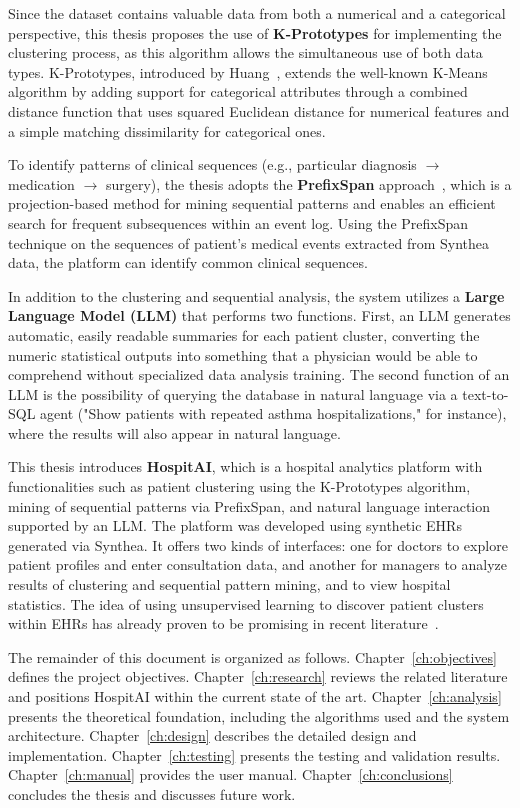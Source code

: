 Since the dataset contains valuable data from both a numerical and a categorical perspective, this thesis proposes the use of \textbf{K-Prototypes} for implementing the clustering process, as this algorithm allows the simultaneous use of both data types. K-Prototypes, introduced by Huang~\cite{Huang1998KPrototypes}, extends the well-known K-Means algorithm by adding support for categorical attributes through a combined distance function that uses squared Euclidean distance for numerical features and a simple matching dissimilarity for categorical ones.

To identify patterns of clinical sequences (e.g., particular diagnosis $\rightarrow$ medication $\rightarrow$ surgery), the thesis adopts the \textbf{PrefixSpan} approach~\cite{Pei2004PrefixSpan}, which is a projection-based method for mining sequential patterns and enables an efficient search for frequent subsequences within an event log. Using the PrefixSpan technique on the sequences of patient’s medical events extracted from Synthea data, the platform can identify common clinical sequences.

In addition to the clustering and sequential analysis, the system utilizes a \textbf{Large Language Model (LLM)} that performs two functions. First, an LLM generates automatic, easily readable summaries for each patient cluster, converting the numeric statistical outputs into something that a physician would be able to comprehend without specialized data analysis training. The second function of an LLM is the possibility of querying the database in natural language via a text-to-SQL agent ("Show patients with repeated asthma hospitalizations," for instance), where the results will also appear in natural language.

This thesis introduces \textbf{HospitAI}, which is a hospital analytics platform with functionalities such as patient clustering using the K-Prototypes algorithm, mining of sequential patterns via PrefixSpan, and natural language interaction supported by an LLM. The platform was developed using synthetic EHRs generated via Synthea. It offers two kinds of interfaces: one for doctors to explore patient profiles and enter consultation data, and another for managers to analyze results of clustering and sequential pattern mining, and to view hospital statistics. The idea of using unsupervised learning to discover patient clusters within EHRs has already proven to be promising in recent literature~\cite{Wang2020UnsupervisedEHR}.

The remainder of this document is organized as follows. Chapter~\ref{ch:objectives} defines the project objectives. Chapter~\ref{ch:research} reviews the related literature and positions HospitAI within the current state of the art. Chapter~\ref{ch:analysis} presents the theoretical foundation, including the algorithms used and the system architecture. Chapter~\ref{ch:design} describes the detailed design and implementation. Chapter~\ref{ch:testing} presents the testing and validation results. Chapter~\ref{ch:manual} provides the user manual. Chapter~\ref{ch:conclusions} concludes the thesis and discusses future work.